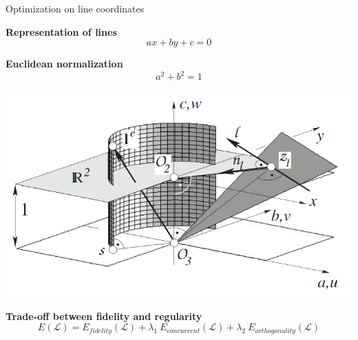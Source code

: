 \begin{frame}{Optimization on line coordinates}
	\small
	
	\begin{minipage}{0.5\linewidth}
		\textbf{Representation of lines}
		\[ a x + b y + c = 0 \]
	
		\textbf{Euclidean normalization}
		\[ a^2 + b^2 = 1 \]
	\end{minipage}%
	\begin{minipage}{0.5\linewidth}
		\includegraphics[width=\linewidth]{euclidean_normalization_line}
	\end{minipage}
	
	\vspace{1cm}
	
	\textbf{Trade-off between fidelity and regularity}
	\[ 
	E(\mathcal{L}) = E_{fidelity}(\mathcal{L}) + \lambda_1 \: E_{concurrent}(\mathcal{L}) + {\lambda_2} \: E_{orthogonality}(\mathcal{L})
	\]
	
\end{frame}


